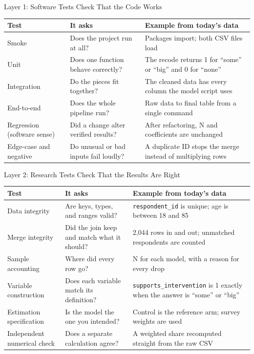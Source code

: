 \documentclass[aspectratio=169, 11pt]{beamer}
\begin{document}

\begin{frame}{Layer 1: Software Tests Check That the Code Works}
  \footnotesize
  \renewcommand{\arraystretch}{1.2}
  \begin{tabular}{@{}L{0.19\textwidth}L{0.30\textwidth}L{0.41\textwidth}@{}}
    \toprule
    \textbf{Test} & \textbf{It asks} & \textbf{Example from today's data} \\
    \midrule
    Smoke & Does the project run at all? & Packages import; both CSV files load \\
    Unit & Does one function behave correctly? & The recode returns 1 for ``some'' or ``big'' and 0 for ``none'' \\
    Integration & Do the pieces fit together? & The cleaned data has every column the model script uses \\
    End-to-end & Does the whole pipeline run? & Raw data to final table from a single command \\
    Regression (software sense) & Did a change alter verified results? & After refactoring, N and coefficients are unchanged \\
    Edge-case and negative & Do unusual or bad inputs fail loudly? & A duplicate ID stops the merge instead of multiplying rows \\
    \bottomrule
  \end{tabular}
\end{frame}

\begin{frame}{Layer 2: Research Tests Check That the Results Are Right}
  \footnotesize
  \renewcommand{\arraystretch}{1.2}
  \begin{tabular}{@{}L{0.19\textwidth}L{0.30\textwidth}L{0.41\textwidth}@{}}
    \toprule
    \textbf{Test} & \textbf{It asks} & \textbf{Example from today's data} \\
    \midrule
    Data integrity & Are keys, types, and ranges valid? & \texttt{respondent\_id} is unique; age is between 18 and 85 \\
    Merge integrity & Did the join keep and match what it should? & 2,044 rows in and out; unmatched respondents are counted \\
    Sample accounting & Where did every row go? & N for each model, with a reason for every drop \\
    Variable construction & Does each variable match its definition? & \texttt{supports\_intervention} is 1 exactly when the answer is ``some'' or ``big'' \\
    Estimation specification & Is the model the one you intended? & Control is the reference arm; survey weights are used \\
    Independent numerical check & Does a separate calculation agree? & A weighted share recomputed straight from the raw CSV \\
    \bottomrule
  \end{tabular}
\end{frame}
\end{document}
